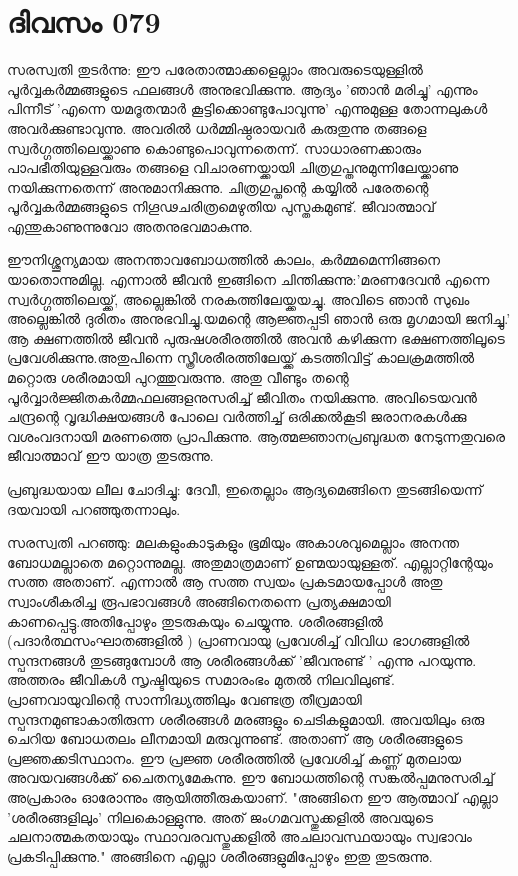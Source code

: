  
\section{ദിവസം 079}


സരസ്വതി തുടര്‍ന്നു: ഈ പരേതാത്മാക്കളെല്ലാം അവരുടെയുള്ളില്‍ പൂര്‍വ്വകര്‍മ്മങ്ങളുടെ ഫലങ്ങള്‍ അനുഭവിക്കുന്നു. ആദ്യം 'ഞാന്‍ മരിച്ചു' എന്നും പിന്നീട്‌ 'എന്നെ യമദൂതന്മാര്‍ കൂട്ടിക്കൊണ്ടുപോവുന്നു' എന്നുമുള്ള തോന്നലുകള്‍ അവര്‍ക്കുണ്ടാവുന്നു. അവരില്‍ ധര്‍മ്മിഷ്ഠരായവര്‍ കരുതുന്നു തങ്ങളെ സ്വര്‍ഗ്ഗത്തിലെയ്ക്കാണു കൊണ്ടുപൊവുന്നതെന്ന്. സാധാരണക്കാരും പാപഭീതിയുള്ളവരും തങ്ങളെ വിചാരണയ്ക്കായി ചിത്രഗുപ്തനുമുന്നിലേയ്ക്കാണു നയിക്കുന്നതെന്ന് അനുമാനിക്കുന്നു. ചിത്രഗുപ്തന്റെ കയ്യില്‍ പരേതന്റെ പൂര്‍വ്വകര്‍മ്മങ്ങളുടെ നിഗൂഢചരിത്രമെഴുതിയ പുസ്തകമുണ്ട്‌. ജീവാത്മാവ്‌ എന്തുകാണുന്നുവോ അതനുഭവമാകുന്നു. 

ഈനിശ്ശൂന്യമായ അനന്താവബോധത്തില്‍ കാലം, കര്‍മ്മമെന്നിങ്ങനെ യാതൊന്നുമില്ല. എന്നാല്‍ ജീവന്‍ ഇങ്ങിനെ ചിന്തിക്കുന്നു:'മരണദേവന്‍ എന്നെ സ്വര്‍ഗ്ഗത്തിലെയ്ക്ക്‌, അല്ലെങ്കില്‍ നരകത്തിലേയ്ക്കയച്ചു. അവിടെ ഞാന്‍ സുഖം അല്ലെങ്കില്‍ ദുരിതം അനുഭവിച്ചു.യമന്റെ ആജ്ഞപ്പടി ഞാന്‍ ഒരു മൃഗമായി ജനിച്ചു.' ആ ക്ഷണത്തില്‍ ജീവന്‍ പുരുഷശരീരത്തില്‍ അവന്‍ കഴിക്കുന്ന ഭക്ഷണത്തിലൂടെ പ്രവേശിക്കുന്നു.അതുപിന്നെ സ്ത്രീശരീരത്തിലേയ്ക്ക്‌ കടത്തിവിട്ട്‌ കാലക്രമത്തില്‍ മറ്റൊരു ശരീരമായി പുറത്തുവരുന്നു. അതു വീണ്ടും തന്റെ പൂര്‍വ്വാര്‍ജ്ജിതകര്‍മ്മഫലങ്ങളനുസരിച്ച്‌ ജീവിതം നയിക്കുന്നു. അവിടെയവന്‍ ചന്ദ്രന്റെ വൃദ്ധിക്ഷയങ്ങള്‍ പോലെ വര്‍ത്തിച്ച്‌ ഒരിക്കല്‍കൂടി ജരാനരകള്‍ക്കു വശംവദനായി മരണത്തെ പ്രാപിക്കുന്നു. ആത്മജ്ഞാനപ്രബുദ്ധത നേടുന്നതുവരെ ജീവാത്മാവ്‌ ഈ യാത്ര തുടരുന്നു.

പ്രബുദ്ധയായ ലീല ചോദിച്ചു: ദേവീ, ഇതെല്ലാം ആദ്യമെങ്ങിനെ തുടങ്ങിയെന്ന് ദയവായി പറഞ്ഞുതന്നാലും.

സരസ്വതി പറഞ്ഞു: മലകളുംകാടുകളും ഭൂമിയും അകാശവുമെല്ലാം അനന്ത ബോധമല്ലാതെ മറ്റൊന്നുമല്ല. അതുമാത്രമാണ്‌ ഉണ്മയായുള്ളത്‌. എല്ലാറ്റിന്റേയും സത്ത അതാണ്‌. എന്നാല്‍ ആ സത്ത സ്വയം പ്രകടമായപ്പോള്‍ അതു സ്വാംശീകരിച്ച രൂപഭാവങ്ങള്‍ അങ്ങിനെതന്നെ പ്രത്യക്ഷമായി കാണപ്പെട്ടു.അതിപ്പോഴും തുടരുകയും ചെയ്യുന്നു. ശരീരങ്ങളില്‍ (പദാര്‍ത്ഥസംഘാതങ്ങളില്‍ ) പ്രാണവായു പ്രവേശിച്ച്‌ വിവിധ ഭാഗങ്ങളില്‍ സ്പന്ദനങ്ങള്‍  തുടങ്ങുമ്പോള്‍ ആ ശരീരങ്ങള്‍ക്ക്‌ 'ജീവനുണ്ട്‌ ' എന്നു പറയുന്നു. അത്തരം ജീവികള്‍ സൃഷ്ടിയുടെ സമാരംഭം മുതല്‍ നിലവിലുണ്ട്‌. പ്രാണവായുവിന്റെ സാന്നിദ്ധ്യത്തിലും വേണ്ടത്ര തീവ്രമായി സ്പന്ദനമുണ്ടാകാതിരുന്ന ശരീരങ്ങള്‍ മരങ്ങളും ചെടികളുമായി. അവയിലും ഒരു ചെറിയ ബോധതലം ലീനമായി മരുവുന്നുണ്ട്‌. അതാണ്‌ ആ ശരീരങ്ങളുടെ പ്രജ്ഞക്കടിസ്ഥാനം. ഈ പ്രജ്ഞ ശരീരത്തില്‍ പ്രവേശിച്ച്‌ കണ്ണ് മുതലായ അവയവങ്ങള്‍ക്ക്‌ ചൈതന്യമേകുന്നു. ഈ ബോധത്തിന്റെ സങ്കല്‍പ്പമനുസരിച്ച്‌ അപ്രകാരം ഓരോന്നും ആയിത്തീരുകയാണ്‌. "അങ്ങിനെ ഈ ആത്മാവ്‌ എല്ലാ 'ശരീരങ്ങളിലും' നിലകൊള്ളുന്നു. അത്‌ ജംഗമവസ്തുക്കളില്‍ അവയുടെ ചലനാത്മകതയായും സ്ഥാവരവസ്തുക്കളില്‍ അചലാവസ്ഥയായും സ്വഭാവം പ്രകടിപ്പിക്കുന്നു." അങ്ങിനെ എല്ലാ ശരീരങ്ങളുമിപ്പോഴും ഇതു തുടരുന്നു.
